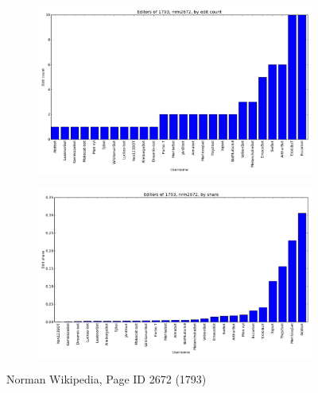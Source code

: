 \begin{figure}
   \centering
    \begin{subfigure}[b]{0.5\linewidth}
      \centering
      \includegraphics[width=\linewidth]{img/editshare/nrm2672count.png}
    \end{subfigure}
    \begin{subfigure}[b]{0.5\linewidth}
      \centering
      \includegraphics[width=\linewidth]{img/editshare/nrm2672share.png}
    \end{subfigure}
    \caption{Norman Wikipedia, Page ID 2672 (1793)}
\end{figure}
